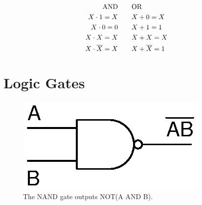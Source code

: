 \begin{subequations}
	\begin{align}
	\mathrm{AND} \qquad & \mathrm{OR}\notag\\
	X\cdot1 = X \qquad & X + 0 = X\\	
	X\cdot0 = 0 \qquad & X + 1 = 1\\	
	X\cdot X = X \qquad & X + X = X\\	
	X\cdot\overline{X} = X \qquad & X + \overline{X} = 1\\
	\end{align}
\end{subequations}

\section{Logic Gates}
\begin{figure}[!htb]
	\centering
	\includegraphics[scale=0.7]{logic/NAND.eps}
	\caption{The NAND gate outputs NOT(A AND B).}
	\label{fig:nand}
  \end{figure} 